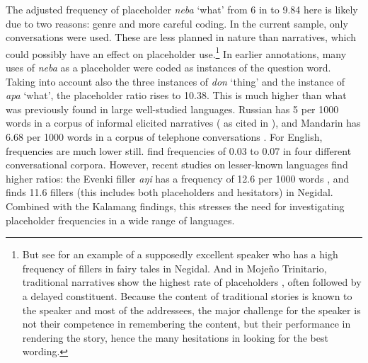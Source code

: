 \documentclass[output=paper,colorlinks,citecolor=brown
\ChapterDOI{10.5281/zenodo.15697587}
]{langscibook}
\begin{document}
The adjusted frequency of placeholder \textit{neba} `what' from 6 in \citet{visser2022} to 9.84 here is likely due to two reasons: genre and more careful coding. In the current sample, only conversations were used. These are less planned in nature than narratives, which could possibly have an effect on placeholder use.\footnote{But see \citet{chapters/pakendorf} for an example of a supposedly excellent speaker who has a high frequency of fillers in fairy tales in Negidal. And in Mojeño Trinitario, traditional narratives show the highest rate of placeholders \citep{rosetalk}, often followed by a delayed constituent. %
Because the content of traditional stories is known to the speaker and most of the addressees, the major challenge for the speaker is not their competence in remembering the content, but their performance in rendering the story, hence the many hesitations in looking for the best wording.} In earlier annotations, many uses of \textit{neba} as a placeholder were coded as instances of the question word. Taking into account also the three instances of \textit{don} `thing' and the instance of \textit{apa} `what', the placeholder ratio rises to 10.38. This is much higher than what was previously found in large well-studied languages. Russian has 5 per 1000 words in a corpus of informal elicited narratives (\citealt{podlesskaya2006} as cited in \citealt{podlesskaya2010}), and Mandarin has 6.68 per 1000 words in a corpus of telephone conversations \citep{zhao2005}. For English, frequencies are much lower still. \citet{palacios2015} find frequencies of 0.03 to 0.07 in four different conversational corpora. However, recent studies on lesser-known languages find higher ratios: the Evenki filler \textit{aŋi} has a frequency of 12.6 per 1000 words \citep{klyachko2022functions}, and \citet{chapters/pakendorf} finds 11.6 fillers (this includes both placeholders and hesitators) in Negidal. Combined with the Kalamang findings, this stresses the need for investigating placeholder frequencies in a wide range of languages.
 
\end{document}
